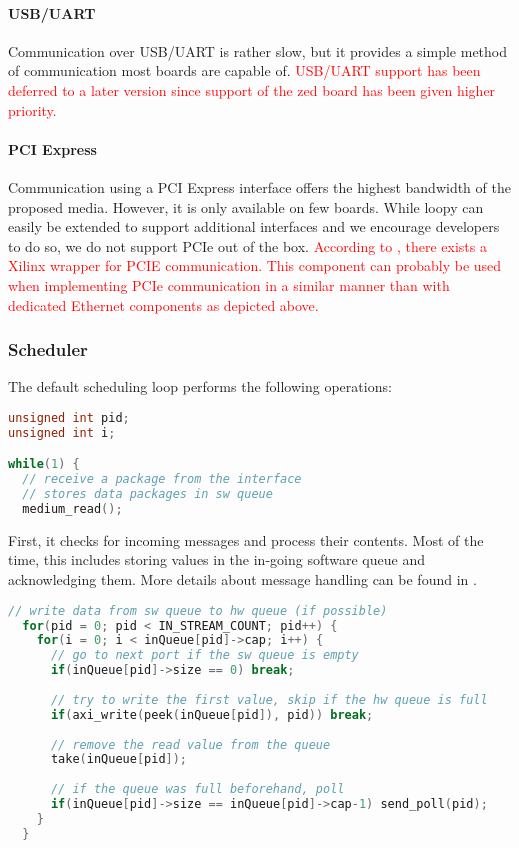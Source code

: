 \documentclass{report}
\begin{document}

\paragraph{USB/UART}
Communication over USB/UART is rather slow, but it provides a simple method of communication most boards are capable of. \textcolor{red}{USB/UART support has been deferred to a later version since support of the zed board has been given higher priority.}

\paragraph{PCI Express}
Communication using a PCI Express interface offers the highest bandwidth of the proposed media. However, it is only available on few boards. While loopy can easily be extended to support additional interfaces and we encourage developers to do so, we do not support PCIe out of the box. \textcolor{red}{According to \cite{alachiotis10}, there exists a Xilinx wrapper for PCIE communication. This component can probably be used when implementing PCIe communication in a similar manner than with dedicated Ethernet components as depicted above.}

\subsubsection{Scheduler}
The default scheduling loop performs the following operations:

\begin{lstlisting}[language=c, breaklines=true]
unsigned int pid;
unsigned int i;

while(1) {
  // receive a package from the interface
  // stores data packages in sw queue
  medium_read();
\end{lstlisting}

First, it checks for incoming messages and process their contents. Most of the time, this includes storing values in the in-going software queue and acknowledging them. More details about message handling can be found in .

\begin{lstlisting}[language=c, breaklines=true]
  // write data from sw queue to hw queue (if possible)
  for(pid = 0; pid < IN_STREAM_COUNT; pid++) {
    for(i = 0; i < inQueue[pid]->cap; i++) {
      // go to next port if the sw queue is empty
      if(inQueue[pid]->size == 0) break;
        
      // try to write the first value, skip if the hw queue is full
      if(axi_write(peek(inQueue[pid]), pid)) break;
        
      // remove the read value from the queue
      take(inQueue[pid]);
  
      // if the queue was full beforehand, poll
      if(inQueue[pid]->size == inQueue[pid]->cap-1) send_poll(pid);
    }
  }
\end{lstlisting}
\end{document}
